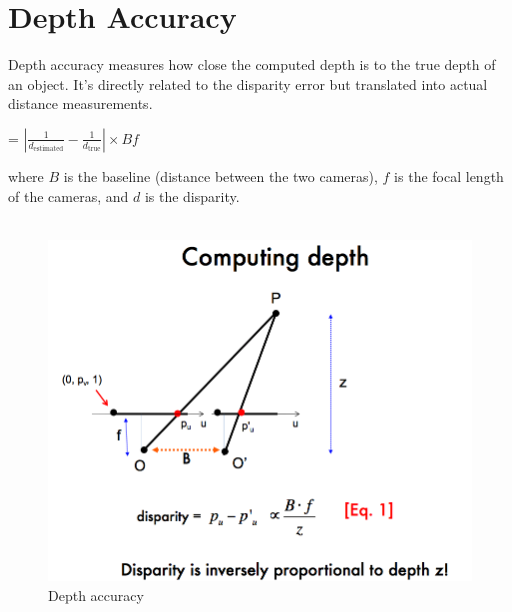 \documentclass[22pt]{report}
\begin{document}
    \section{Depth Accuracy}
        Depth accuracy measures how close the computed depth is to the true depth of an object. It's directly related to the disparity error but translated into actual distance measurements.
        \begin{center}
             = \(\left| \frac{1}{d_{\text{estimated}}} - \frac{1}{d_{\text{true}}} \right| \times Bf\)
        \end{center}
        where \(B\) is the baseline (distance between the two cameras), \(f\) is the focal length of the cameras, and \(d\) is the disparity.\\ \\
        \begin{figure}
            \centering
            \includegraphics[width=0.5\linewidth]{Images/DepthAccuracy.png}
            \caption{Depth accuracy}
            \label{fig:enter-label}
        \end{figure}
    
    
\end{document}
